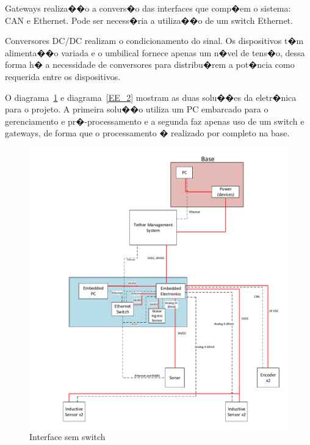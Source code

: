 Gateways realiza��o a convers�o das interfaces que comp�em o sistema: CAN e
Ethernet. Pode ser necess�ria a utiliza��o de um switch Ethernet.

Conversores DC/DC realizam o condicionamento do sinal. Os dispositivos t�m
alimenta��o variada e o umbilical fornece apenas um n�vel de tens�o, dessa forma
h� a necessidade de conversores para distribu�rem a pot�ncia como requerida
entre os dispositivos.

O diagrama~\ref{EE_1} e diagrama~\ref{EE_2} mostram as duas solu��es da
eletr�nica para o projeto. A primeira solu��o utiliza um PC embarcado para o
gerenciamento e pr�-processamento e a segunda faz apenas uso de um switch e
gateways, de forma que o processamento � realizado por completo na base.

\begin{figure}[H]
    \centering
    \includegraphics[width=1\columnwidth]{figs/EE/1.pdf}
    \caption{Interface sem switch}
    \label{EE_1}
\end{figure}

